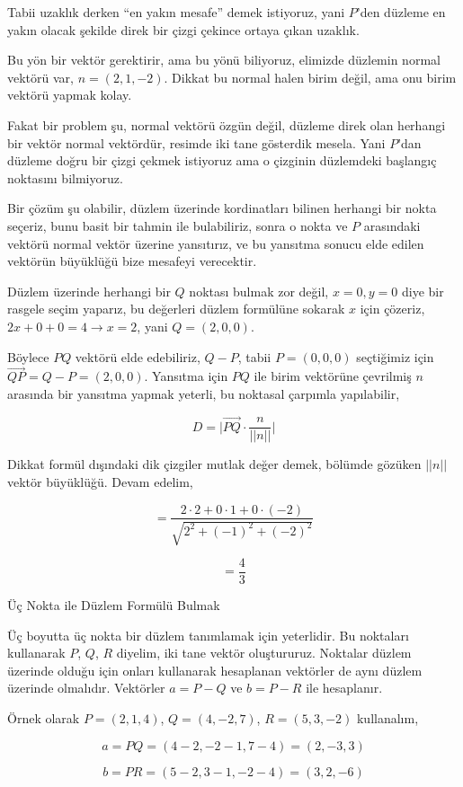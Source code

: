 \documentclass[12pt,fleqn]{article}\usepackage{../../common}
\begin{document}
Tabii uzaklık derken ``en yakın mesafe'' demek istiyoruz, yani $P$'den düzleme
en yakın olacak şekilde direk bir çizgi çekince ortaya çıkan uzaklık.

Bu yön bir vektör gerektirir, ama bu yönü biliyoruz, elimizde düzlemin normal
vektörü var, $n = (2,1,-2)$. Dikkat bu normal halen birim değil, ama onu birim
vektörü yapmak kolay.

Fakat bir problem şu, normal vektörü özgün değil, düzleme direk olan herhangi
bir vektör normal vektördür, resimde iki tane gösterdik mesela. Yani $P$'dan
düzleme doğru bir çizgi çekmek istiyoruz ama o çizginin düzlemdeki başlangıç
noktasını bilmiyoruz. 

Bir çözüm şu olabilir, düzlem üzerinde kordinatları bilinen herhangi bir nokta
seçeriz, bunu basit bir tahmin ile bulabiliriz, sonra o nokta ve $P$ arasındaki
vektörü normal vektör üzerine yansıtırız, ve bu yansıtma sonucu elde edilen
vektörün büyüklüğü bize mesafeyi verecektir.

Düzlem üzerinde herhangi bir $Q$ noktası bulmak zor değil, $x=0,y=0$ diye bir
rasgele seçim yaparız, bu değerleri düzlem formülüne sokarak $x$ için çözeriz,
$2x + 0 + 0 = 4 \to x = 2$, yani $Q = (2,0,0)$.

Böylece $PQ$ vektörü elde edebiliriz, $Q - P$, tabii $P = (0,0,0)$ seçtiğimiz
için $\vec{QP} = Q - P = (2,0,0)$. Yansıtma için $PQ$ ile birim vektörüne
çevrilmiş $n$ arasında bir yansıtma yapmak yeterli, bu noktasal çarpımla
yapılabilir,

$$
D =  \bigg| \vec{PQ} \cdot \frac{n}{||n||} \bigg|
$$

Dikkat formül dışındaki dik çizgiler mutlak değer demek, bölümde gözüken $||n||$
vektör büyüklüğü. Devam edelim,

$$
= \frac{2 \cdot 2 + 0 \cdot 1 + 0 \cdot (-2) }{ \sqrt{2^2 + (-1)^2 + (-2)^2} } 
$$

$$
= \frac{4}{3}
$$

Üç Nokta ile Düzlem Formülü Bulmak

Üç boyutta üç nokta bir düzlem tanımlamak için yeterlidir. Bu noktaları
kullanarak $P$, $Q$, $R$ diyelim, iki tane vektör oluştururuz. Noktalar düzlem
üzerinde olduğu için onları kullanarak hesaplanan vektörler de aynı düzlem
üzerinde olmalıdır. Vektörler $a = P-Q$ ve $b = P-R$ ile hesaplanır.

Örnek olarak $P = (2,1,4)$, $Q = (4,-2,7)$, $R = (5,3,-2)$ kullanalım,

$$
a = PQ = (4-2, -2-1, 7-4) = (2,-3,3)
$$

$$
b = PR = (5-2, 3-1, -2-4) = (3,2,-6)
$$
\end{document}
